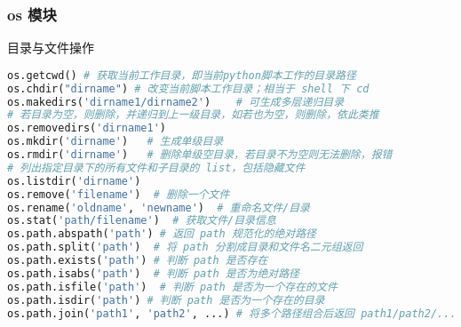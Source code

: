 \subsubsection{os 模块}
目录与文件操作
\begin{lstlisting}[language=python]
os.getcwd() # 获取当前工作目录，即当前python脚本工作的目录路径
os.chdir("dirname") # 改变当前脚本工作目录；相当于 shell 下 cd
os.makedirs('dirname1/dirname2')    # 可生成多层递归目录
# 若目录为空，则删除，并递归到上一级目录，如若也为空，则删除，依此类推
os.removedirs('dirname1')
os.mkdir('dirname')   # 生成单级目录
os.rmdir('dirname')   # 删除单级空目录，若目录不为空则无法删除，报错
# 列出指定目录下的所有文件和子目录的 list，包括隐藏文件
os.listdir('dirname')
os.remove('filename')  # 删除一个文件
os.rename('oldname', 'newname')  # 重命名文件/目录
os.stat('path/filename')  # 获取文件/目录信息
os.path.abspath('path') # 返回 path 规范化的绝对路径
os.path.split('path')  # 将 path 分割成目录和文件名二元组返回
os.path.exists('path') # 判断 path 是否存在
os.path.isabs('path')  # 判断 path 是否为绝对路径
os.path.isfile('path')  # 判断 path 是否为一个存在的文件
os.path.isdir('path') # 判断 path 是否为一个存在的目录
os.path.join('path1', 'path2', ...) # 将多个路径组合后返回 path1/path2/... （最后没有 /）
\end{lstlisting}
